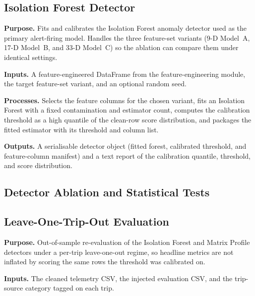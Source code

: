 

\subsection{Isolation Forest Detector}
\label{sec:code_iforest}

\noindent\textbf{Purpose.} Fits and calibrates the Isolation Forest anomaly detector used as the primary alert-firing model. Handles the three feature-set variants (9-D Model~A, 17-D Model~B, and 33-D Model~C) so the ablation can compare them under identical settings.

\noindent\textbf{Inputs.} A feature-engineered DataFrame from the feature-engineering module, the target feature-set variant, and an optional random seed.

\noindent\textbf{Processes.} Selects the feature columns for the chosen variant, fits an Isolation Forest with a fixed contamination and estimator count, computes the calibration threshold as a high quantile of the clean-row score distribution, and packages the fitted estimator with its threshold and column list.

\noindent\textbf{Outputs.} A serialisable detector object (fitted forest, calibrated threshold, and feature-column manifest) and a text report of the calibration quantile, threshold, and score distribution.



\subsection*{Detector Ablation and Statistical Tests}

\subsection{Leave-One-Trip-Out Evaluation}
\label{sec:code_loto_evaluate}

\noindent\textbf{Purpose.} Out-of-sample re-evaluation of the Isolation Forest and Matrix Profile detectors under a per-trip leave-one-out regime, so headline metrics are not inflated by scoring the same rows the threshold was calibrated on.

\noindent\textbf{Inputs.} The cleaned telemetry CSV, the injected evaluation CSV, and the trip-source category tagged on each trip.

